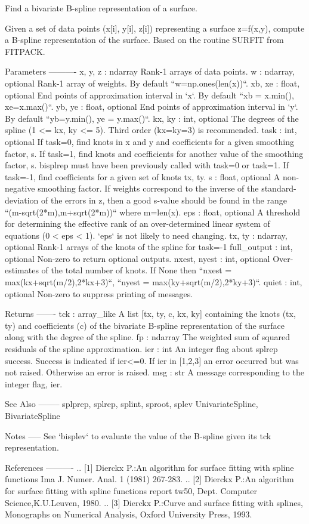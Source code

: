 \begin{DoxyVerb}Find a bivariate B-spline representation of a surface.

Given a set of data points (x[i], y[i], z[i]) representing a surface
z=f(x,y), compute a B-spline representation of the surface. Based on
the routine SURFIT from FITPACK.

Parameters
----------
x, y, z : ndarray
    Rank-1 arrays of data points.
w : ndarray, optional
    Rank-1 array of weights. By default ``w=np.ones(len(x))``.
xb, xe : float, optional
    End points of approximation interval in `x`.
    By default ``xb = x.min(), xe=x.max()``.
yb, ye : float, optional
    End points of approximation interval in `y`.
    By default ``yb=y.min(), ye = y.max()``.
kx, ky : int, optional
    The degrees of the spline (1 <= kx, ky <= 5).
    Third order (kx=ky=3) is recommended.
task : int, optional
    If task=0, find knots in x and y and coefficients for a given
    smoothing factor, s.
    If task=1, find knots and coefficients for another value of the
    smoothing factor, s.  bisplrep must have been previously called
    with task=0 or task=1.
    If task=-1, find coefficients for a given set of knots tx, ty.
s : float, optional
    A non-negative smoothing factor.  If weights correspond
    to the inverse of the standard-deviation of the errors in z,
    then a good s-value should be found in the range
    ``(m-sqrt(2*m),m+sqrt(2*m))`` where m=len(x).
eps : float, optional
    A threshold for determining the effective rank of an
    over-determined linear system of equations (0 < eps < 1).
    `eps` is not likely to need changing.
tx, ty : ndarray, optional
    Rank-1 arrays of the knots of the spline for task=-1
full_output : int, optional
    Non-zero to return optional outputs.
nxest, nyest : int, optional
    Over-estimates of the total number of knots. If None then
    ``nxest = max(kx+sqrt(m/2),2*kx+3)``,
    ``nyest = max(ky+sqrt(m/2),2*ky+3)``.
quiet : int, optional
    Non-zero to suppress printing of messages.

Returns
-------
tck : array_like
    A list [tx, ty, c, kx, ky] containing the knots (tx, ty) and
    coefficients (c) of the bivariate B-spline representation of the
    surface along with the degree of the spline.
fp : ndarray
    The weighted sum of squared residuals of the spline approximation.
ier : int
    An integer flag about splrep success.  Success is indicated if
    ier<=0. If ier in [1,2,3] an error occurred but was not raised.
    Otherwise an error is raised.
msg : str
    A message corresponding to the integer flag, ier.

See Also
--------
splprep, splrep, splint, sproot, splev
UnivariateSpline, BivariateSpline

Notes
-----
See `bisplev` to evaluate the value of the B-spline given its tck
representation.

References
----------
.. [1] Dierckx P.:An algorithm for surface fitting with spline functions
   Ima J. Numer. Anal. 1 (1981) 267-283.
.. [2] Dierckx P.:An algorithm for surface fitting with spline functions
   report tw50, Dept. Computer Science,K.U.Leuven, 1980.
.. [3] Dierckx P.:Curve and surface fitting with splines, Monographs on
   Numerical Analysis, Oxford University Press, 1993.\end{DoxyVerb}
